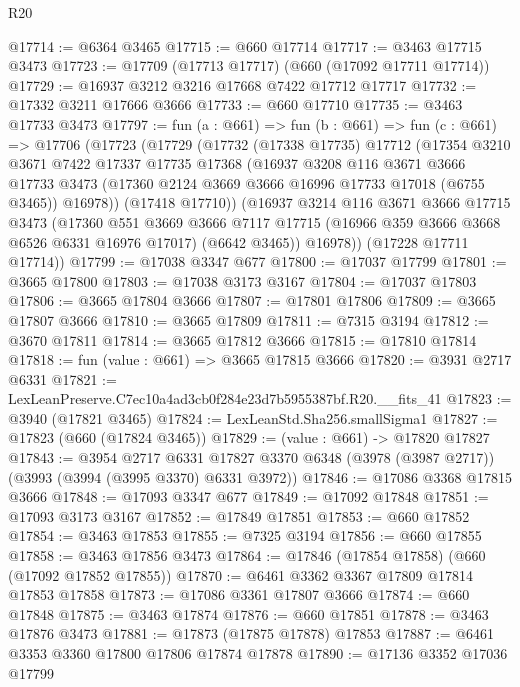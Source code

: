 \begin{lexlean}{R20}
\begin{coremodule}
@17714 := @6364 @3465
@17715 := @660 @17714
@17717 := @3463 @17715 @3473
@17723 := @17709 (@17713 @17717) (@660 (@17092 @17711 @17714))
@17729 := @16937 @3212 @3216 @17668 @7422 @17712 @17717
@17732 := @17332 @3211 @17666 @3666
@17733 := @660 @17710
@17735 := @3463 @17733 @3473
@17797 := fun (a : @661) =>
  fun (b : @661) =>
  fun (c : @661) =>
  @17706
    (@17723
      (@17729
        (@17732
          (@17338 @17735)
          @17712
          (@17354
            @3210
            @3671
            @7422
            @17337
            @17735
            @17368
            (@16937
              @3208
              @116
              @3671
              @3666
              @17733
              @3473
              (@17360 @2124 @3669 @3666 @16996 @17733 @17018 (@6755 @3465))
              @16978))
          (@17418 @17710))
        (@16937
          @3214
          @116
          @3671
          @3666
          @17715
          @3473
          (@17360
            @551
            @3669
            @3666
            @7117
            @17715
            (@16966 @359 @3666 @3668 @6526 @6331 @16976 @17017)
            (@6642 @3465))
          @16978))
      (@17228 @17711 @17714))
@17799 := @17038 @3347 @677
@17800 := @17037 @17799
@17801 := @3665 @17800
@17803 := @17038 @3173 @3167
@17804 := @17037 @17803
@17806 := @3665 @17804 @3666
@17807 := @17801 @17806
@17809 := @3665 @17807 @3666
@17810 := @3665 @17809
@17811 := @7315 @3194
@17812 := @3670 @17811
@17814 := @3665 @17812 @3666
@17815 := @17810 @17814
@17818 := fun (value : @661) => @3665 @17815 @3666
@17820 := @3931 @2717 @6331
@17821 := LexLeanPreserve.C7ec10a4ad3cb0f284e23d7b5955387bf.R20.__fits_41
@17823 := @3940 (@17821 @3465)
@17824 := LexLeanStd.Sha256.smallSigma1
@17827 := @17823 (@660 (@17824 @3465))
@17829 := (value : @661) -> @17820 @17827
@17843 := @3954
    @2717
    @6331
    @17827
    @3370
    @6348
    (@3978 (@3987 @2717))
    (@3993 (@3994 (@3995 @3370) @6331 @3972))
@17846 := @17086 @3368 @17815 @3666
@17848 := @17093 @3347 @677
@17849 := @17092 @17848
@17851 := @17093 @3173 @3167
@17852 := @17849 @17851
@17853 := @660 @17852
@17854 := @3463 @17853
@17855 := @7325 @3194
@17856 := @660 @17855
@17858 := @3463 @17856 @3473
@17864 := @17846 (@17854 @17858) (@660 (@17092 @17852 @17855))
@17870 := @6461 @3362 @3367 @17809 @17814 @17853 @17858
@17873 := @17086 @3361 @17807 @3666
@17874 := @660 @17848
@17875 := @3463 @17874
@17876 := @660 @17851
@17878 := @3463 @17876 @3473
@17881 := @17873 (@17875 @17878) @17853
@17887 := @6461 @3353 @3360 @17800 @17806 @17874 @17878
@17890 := @17136 @3352 @17036 @17799

\end{coremodule}
\end{lexlean}
